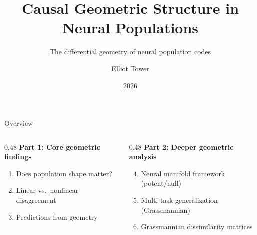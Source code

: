 \documentclass[aspectratio=169,11pt]{beamer}
\title{Causal Geometric Structure in Neural Populations}
\subtitle{The differential geometry of neural population codes}
\author{Elliot Tower}
\date{2026}
\institute{}
\begin{document}
\maketitle

\begin{frame}{Overview}

\begin{columns}[T]
\begin{column}{0.48\textwidth}
\textbf{Part 1: Core geometric findings}
{\small
\begin{enumerate}
  \item Does population shape matter?
  \item Linear vs.\ nonlinear disagreement
  \item Predictions from geometry
\end{enumerate}
}
\end{column}
\begin{column}{0.48\textwidth}
\textbf{Part 2: Deeper geometric analysis}
{\small
\begin{enumerate}
  \setcounter{enumi}{3}
  \item Neural manifold framework (potent/null)
  \item Multi-task generalization (Grassmannian)
  \item Grassmannian dissimilarity matrices
\end{enumerate}
}
\end{column}
\end{columns}
\end{frame}
\end{document}

